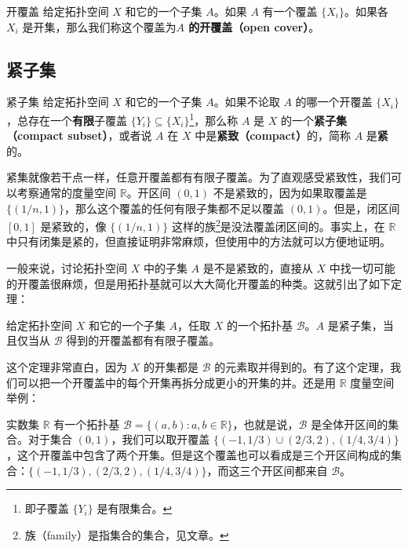 \begin{definition}{开覆盖}
给定拓扑空间 $X$ 和它的一个子集 $A$。如果 $A$ 有一个覆盖 $\{X_i\}$。如果各 $X_i$ 是开集，那么我们称这个覆盖为\textbf{$A$ 的开覆盖（open cover）}。
\end{definition}

\subsection{紧子集}


\begin{definition}{紧子集}\label{def_Topo2_1}
给定拓扑空间 $X$ 和它的一个子集 $A$。如果不论取 $A$ 的哪一个开覆盖 $\{X_i\}$，总存在一个\textbf{有限}子覆盖 $\{Y_i\}\subseteq \{X_i\}$\footnote{即子覆盖 $\{Y_i\}$ 是有限集合。}，那么称 $A$ 是 $X$ 的一个\textbf{紧子集（compact subset）}，或者说 $A$ 在 $X$ 中是\textbf{紧致（compact）}的，简称 $A$ 是\textbf{紧}的。
\end{definition}

紧集就像若干点一样，任意开覆盖都有有限子覆盖。为了直观感受紧致性，我们可以考察通常的度量空间 $\mathbb{R}$。开区间 $(0,1)$ 不是紧致的，因为如果取覆盖是 $\{(1/n, 1)\}$，那么这个覆盖的任何有限子集都不足以覆盖 $(0, 1)$。但是，闭区间 $[0,1]$ 是紧致的，像 $\{(1/n, 1)\}$ 这样的族\footnote{族（family）是指集合的集合，见文章。}是没法覆盖闭区间的。事实上，在 $\mathbb{R}$ 中只有闭集是紧的，但直接证明非常麻烦，但使用中的方法就可以方便地证明。

一般来说，讨论拓扑空间 $X$ 中的子集 $A$ 是不是紧致的，直接从 $X$ 中找一切可能的开覆盖很麻烦，但是用拓扑基就可以大大简化开覆盖的种类。这就引出了如下定理：

\begin{theorem}{}\label{the_Topo2_1}
给定拓扑空间 $X$ 和它的一个子集 $A$，任取 $X$ 的一个拓扑基 $\mathcal{B}$。$A$ 是紧子集，当且仅当从 $\mathcal{B}$ 得到的开覆盖都有有限子覆盖。
\end{theorem}

这个定理非常直白，因为 $X$ 的开集都是 $\mathcal{B}$ 的元素取并得到的。有了这个定理，我们可以把一个开覆盖中的每个开集再拆分成更小的开集的并。还是用 $\mathbb{R}$ 度量空间举例：

\begin{example}{}\label{ex_Topo2_1}
实数集 $\mathbb{R}$ 有一个拓扑基 $\mathcal{B}=\{(a,b):a,b\in \mathbb{R}\}$，也就是说，$\mathcal{B}$ 是全体开区间的集合。对于集合 $(0,1)$，我们可以取开覆盖 $\{(-1,1/3)\cup(2/3,2), (1/4, 3/4)\}$，这个开覆盖中包含了两个开集。但是这个覆盖也可以看成是三个开区间构成的集合：$\{(-1,1/3), (2/3,2), (1/4, 3/4)\}$，而这三个开区间都来自 $\mathcal{B}$。

\end{example}

